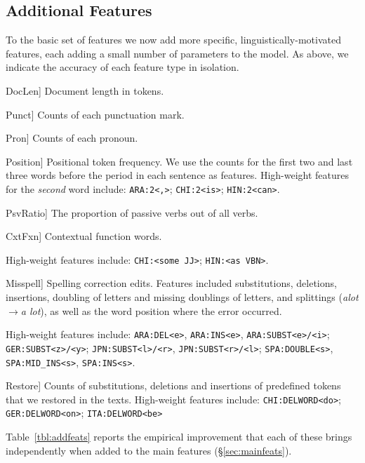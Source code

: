 \documentclass[11pt,letterpaper]{article}
\newcommand{\ensuretext}[1]{#1}
\newcommand{\nssmarker}{\ensuretext{\textcolor{magenta}{\ensuremath{^{\textsc{NS}}_{\textsc{S}}}}}}
\newcommand{\arkcomment}[3]{}
\newcommand{\nss}[1]{\arkcomment{\nssmarker}{#1}{magenta}}
\newcommand{\Sref}[1]{\S\ref{#1}}
\newcommand{\Tref}[1]{Table~\ref{#1}}
\newcommand{\feat}[1]{\textsmaller[.5]{\textsf{#1}}} %
\newcommand{\textnl}{\textit}
\begin{document}
\subsection{Additional Features}\label{sec:addfeats}
To the basic set of features we now add more specific,
linguistically-motivated features, each adding a small number of
parameters to the model.  As above, we indicate the accuracy of each
feature type in isolation.

\begin{compactdesc}
\item[\feat{DocLen}] Document length in tokens.
\item[\feat{Punct}] Counts of each punctuation mark. 
\item[\feat{Pron}] Counts of each pronoun.
\item[\feat{Position}] Positional token frequency. We use the counts
  for the first two and last three words before the period in each
  sentence as features. High-weight features for the \emph{second} word include: {\tt ARA:2<,>}; {\tt CHI:2<is>}; {\tt HIN:2<can>}.
\item[\feat{PsvRatio}] The proportion of passive verbs out of all
  verbs.
\item[\feat{CxtFxn}] Contextual function words. \raggedright High-weight features include: {\tt CHI:<some JJ>}; \mbox{\tt HIN:<as VBN>}. 
\item[\feat{Misspell}] Spelling correction edits. Features included substitutions, deletions, insertions, doubling of letters and missing doublings of letters, and splittings (\textnl{alot}$\rightarrow$\textnl{a lot}), as well as the word position where the error occurred. %
\raggedright High-weight features include: {\tt ARA:DEL<e>}, {\tt ARA:INS<e>}, {\tt ARA:SUBST<e>/<i>}; {\tt GER:SUBST<z>/<y>}; {\tt JPN:SUBST<l>/<r>}, {\tt JPN:SUBST<r>/<l>}; {\tt SPA:DOUBLE<s>}, {\tt SPA:MID\_INS<s>}, {\tt SPA:INS<s>}.
\item[\feat{Restore}] Counts of substitutions, deletions and
  insertions of predefined tokens that we restored in the texts. High-weight features include: {\tt CHI:DELWORD<do>}; {\tt GER:DELWORD<on>}; {\tt ITA:DELWORD<be>}  
\end{compactdesc}
\noindent
\Tref{tbl:addfeats} reports the empirical improvement that each of
these brings independently when added to the main features
(\Sref{sec:mainfeats}).
\end{document}
